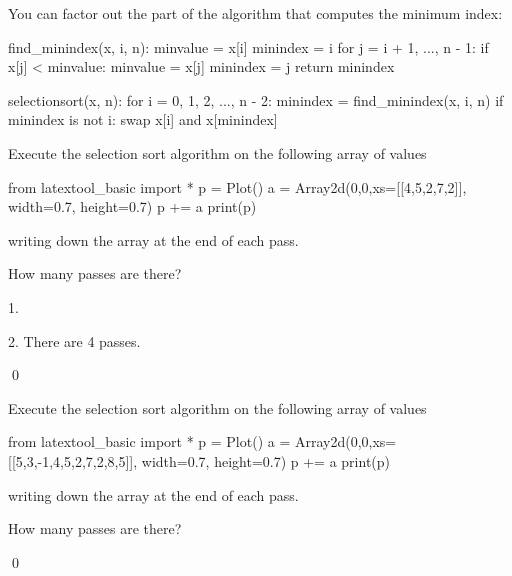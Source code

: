 You can factor out the part of the algorithm that computes the 
minimum index:
\begin{console}
find_minindex(x, i, n):
    minvalue = x[i]
    minindex = i
    for j = i + 1, ..., n - 1:
        if x[j] < minvalue:
            minvalue = x[j]
            minindex = j
    return minindex

selectionsort(x, n):
    for i = 0, 1, 2, ..., n - 2:
        minindex = find_minindex(x, i, n)
        if minindex is not i:
            swap x[i] and x[minindex]
\end{console}

\newpage
\begin{ex}
\begin{tightlist}
\item Execute the selection sort algorithm on the following array of values

\begin{python}
from latextool_basic import *
p = Plot()
a = Array2d(0,0,xs=[[4,5,2,7,2]], width=0.7, height=0.7)
p += a
print(p)
\end{python}

writing down the array at the end of each pass.
\item How many passes are there?
\end{tightlist}
\end{ex}

\SOLUTION

1. 

2. There are 4 passes.

\qed

\newpage
\begin{ex}
\begin{tightlist}
\item Execute the selection sort algorithm on the following array of values
\begin{python}
from latextool_basic import *
p = Plot()
a = Array2d(0,0,xs=[[5,3,-1,4,5,2,7,2,8,5]], width=0.7, height=0.7)
p += a
print(p)
\end{python}
writing down the array at the end of each pass.
\item How many passes are there?
\end{tightlist}
\qed
\end{ex}




